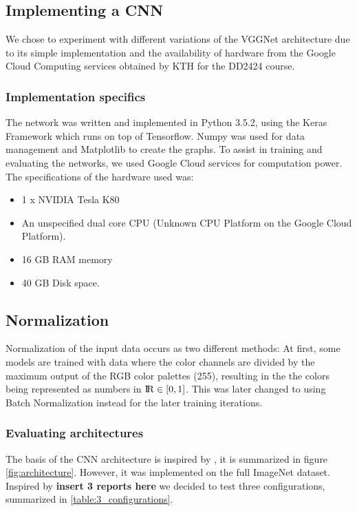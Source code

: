 \documentclass{kthreport}
\begin{document}
\subsection{Implementing a CNN}

We chose to experiment with different variations of the VGGNet architecture due to its simple implementation and the availability of hardware from the Google Cloud Computing services obtained by KTH for the DD2424 course.

\subsubsection{Implementation specifics}

The network was written and implemented in Python 3.5.2, using the Keras Framework which runs on top of Tensorflow. Numpy was used for data management and Matplotlib to create the graphs. To assist in training and evaluating the networks, we used Google Cloud services for computation power. The specifications of the hardware used was:
\begin{itemize}
\item 1 x NVIDIA Tesla K80
\item An unspecified dual core CPU (Unknown CPU Platform on the Google Cloud Platform).
\item 16 GB RAM memory
\item 40 GB Disk space.
\end{itemize}

\subsection{Normalization}
Normalization of the input data occurs as two different methods: At first, some models are trained with data where the color channels are divided by the maximum output of the RGB color palettes (255), resulting in the the colors being represented as numbers in ${\rm I\!R} \in [0,1]$.
This was later changed to using Batch Normalization instead for the later training iterations.

\subsubsection{Evaluating architectures}

The basis of the CNN architecture is inspired by \cite{NIPS2012_4824}, it is summarized in figure \ref{fig:architecture}. However, it was implemented on the full ImageNet dataset. Inspired by \textbf{insert 3 reports here} we decided to test three configurations, summarized in \ref{table:3_configurations}.
\end{document}
